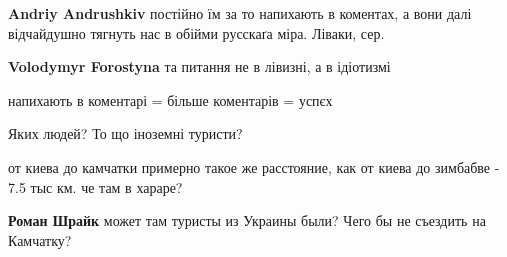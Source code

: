 \begin{itemize}
\textbf{Andriy Andrushkiv} постійно їм за то напихають в коментах, а вони далі відчайдушно тягнуть нас в обійми русскаґа міра. Ліваки, сер.

 
\textbf{Volodymyr Forostyna} та питання не в лівизні, а в ідіотизмі

 
напихають в коментарі = більше коментарів = успєх

 
Яких людей? То що іноземні туристи?

 

от киева до камчатки примерно такое же расстояние, как от киева до зимбабве -
7.5 тыс км. че там в хараре?

\begin{itemize}
 
\textbf{Роман Шрайк} может там туристы из Украины были? Чего бы не съездить на Камчатку?

 

\end{itemize}
\end{itemize}
